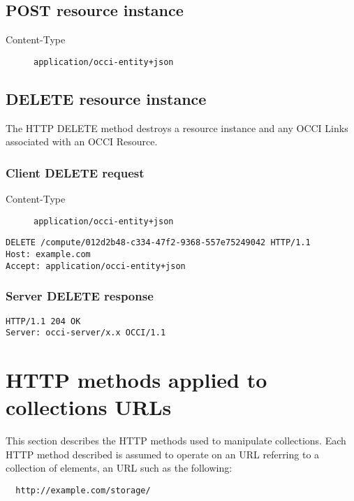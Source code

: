 \documentclass[10pt,a4paper]{article}
\begin{document}
\subsection{POST resource instance}
\begin{description}
\item[Content-Type] {\tt application/occi-entity+json}
\end{description}

\subsection{DELETE resource instance}
The HTTP DELETE method destroys a resource instance and any OCCI Links
associated with an OCCI Resource.

\subsubsection{Client DELETE request}
\begin{description}
\item[Content-Type] {\tt application/occi-entity+json}
\end{description}
\begin{verbatim}
DELETE /compute/012d2b48-c334-47f2-9368-557e75249042 HTTP/1.1
Host: example.com
Accept: application/occi-entity+json
\end{verbatim}

\subsubsection{Server DELETE response}
\begin{verbatim}
HTTP/1.1 204 OK
Server: occi-server/x.x OCCI/1.1
\end{verbatim}


\section{HTTP methods applied to collections URLs}


This section describes the HTTP methods used to manipulate collections. Each
HTTP method described is assumed to operate on an URL referring to a collection
of elements, an URL such as the following:
\begin{verbatim}
  http://example.com/storage/
\end{verbatim}
\end{document}
